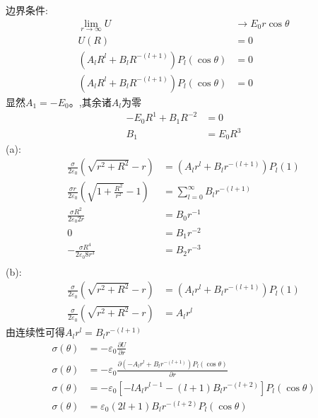 边界条件:
\begin{align*}
    \lim_{r\to\infty}U&\to E_0r\cos\theta\\
    U(R)&=0\\
    \left(
A_{l} R^l
+
B_{l} R^{-(l+1)}
\right)
P_{l}(\cos\theta)&=0\\
    \left(
A_{l} R^l
+
B_{l} R^{-(l+1)}
\right)
P_{l}(\cos\theta)&=0
\end{align*}
显然$A_1 =-E_0$。,其余诸$A_l$为零
\begin{align*}
-E_0R^1
+
B_{1} R^{-2}
&=0\\
B_1&=E_0R^3
\end{align*}
(a):
\begin{align*}
    \frac{\sigma }{2\varepsilon_0}\left(\sqrt{r^2+R^2}-r\right)
    &=\left(
A_{l} r^l
+
B_{l} r^{-(l+1)}
\right)
P_{l}(1)\\
    \frac{\sigma r}{2\varepsilon_0}\left(\sqrt{1+\frac{R^2}{r^2}}-1\right)
    &=
\sum_{l=0}^{\infty}B_{l} r^{-(l+1)}\\
    \frac{\sigma R^2}{2\varepsilon_0 2r}
    &=
B_{0} r^{-1}\\
    0&=
B_{1} r^{-2}\\
-\frac{\sigma R^4}{2\varepsilon_0 8r^3}
    &=
B_{2} r^{-3}\\
\end{align*}
(b):
\begin{align*}
        \frac{\sigma }{2\varepsilon_0}\left(\sqrt{r^2+R^2}-r\right)
    &=\left(
A_{l} r^l
+
B_{l} r^{-(l+1)}
\right)
P_{l}(1)\\
    \frac{\sigma }{2\varepsilon_0}\left(\sqrt{r^2+R^2}-r\right)
    &=A_{l} r^l
\end{align*}
由连续性可得$
    A_{l} r^l=B_{l} r^{-(l+1)}$
\begin{align*}
    \sigma(\theta)&=-\varepsilon_0\frac{\partial U}{\partial r}\\
\sigma(\theta)&=-\varepsilon_0\frac{\partial \left(
-A_{l} r^l
+
B_{l} r^{-(l+1)}
\right)
P_{l}(\cos\theta)}{\partial r}\\
\sigma(\theta)&=-\varepsilon_0{\left[
-lA_{l} r^{l-1}
-(l+1)
B_{l} r^{-(l+2)}
\right]
P_{l}(\cos\theta)}\\
\sigma(\theta)&=\varepsilon_0{
(2l+1)
B_{l} r^{-(l+2)}
P_{l}(\cos\theta)}
\end{align*}
